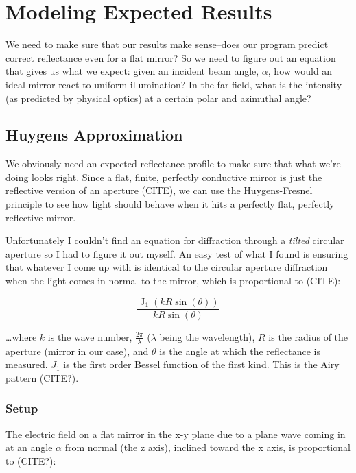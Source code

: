 \documentclass[etd,oneside,senior]{BYUPhys}
\DeclareMathOperator{\J}{J}
\begin{document}
\section{Modeling Expected Results} \label{sec:expected_results}

We need to make sure that our results make sense--does our program predict correct reflectance even for a flat mirror? So we need to figure out an equation that gives us what we expect: given an incident beam angle, $\alpha$, how would an ideal mirror react to uniform illumination? In the far field, what is the intensity (as predicted by physical optics) at a certain polar and azimuthal angle?

\subsection{Huygens Approximation} \label{subsec:huygens_approx}

We obviously need an expected reflectance profile to make sure that what we're doing looks right. Since a flat, finite, perfectly conductive mirror is just the reflective version of an aperture (CITE), we can use the Huygens-Fresnel principle to see how light should behave when it hits a perfectly flat, perfectly reflective mirror.

Unfortunately I couldn't find an equation for diffraction through a \textit{tilted} circular aperture so I had to figure it out myself. An easy test of what I found is ensuring that whatever I come up with is identical to the circular aperture diffraction when the light comes in normal to the mirror, which is proportional to (CITE):

\begin{equation}\label{eq:airy}
  \frac{\J_1(kR\sin(\theta))}{kR\sin(\theta)}
\end{equation}

\ldots where $k$ is the wave number, $\frac{2\pi}{\lambda}$ ($\lambda$ being the wavelength), $R$ is the radius of the aperture (mirror in our case), and $\theta$ is the angle at which the reflectance is measured. $J_1$ is the first order Bessel function of the first kind. This is the Airy pattern (CITE?).

\subsubsection{Setup}

The electric field on a flat mirror in the x-y plane due to a plane wave coming in at an angle $\alpha$ from normal (the z axis), inclined toward the x axis, is proportional to (CITE?):
\end{document}
